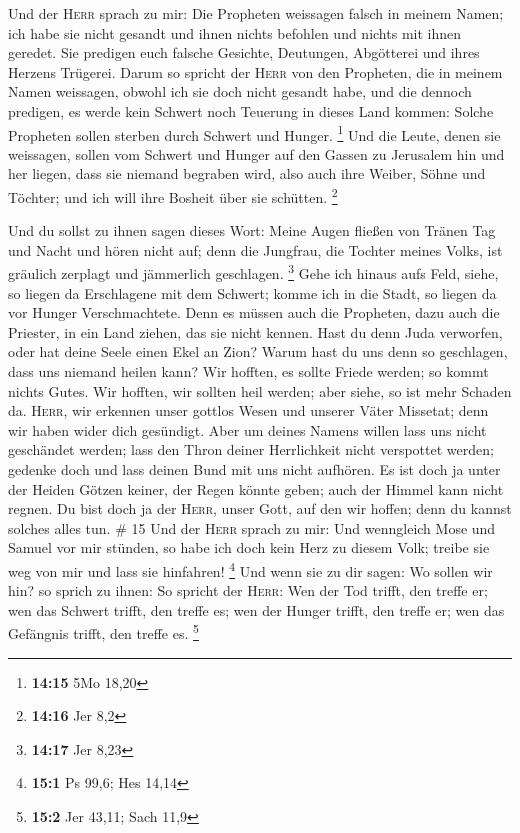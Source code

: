  Und der \textsc{Herr} sprach zu mir: Die Propheten
weissagen falsch in meinem Namen; ich habe sie nicht gesandt und ihnen
nichts befohlen und nichts mit ihnen geredet. Sie predigen euch falsche
Gesichte, Deutungen, Abgötterei und ihres Herzens Trügerei.
 Darum so spricht der \textsc{Herr} von den Propheten,
die in meinem Namen weissagen, obwohl ich sie doch nicht gesandt habe,
und die dennoch predigen, es werde kein Schwert noch Teuerung in dieses
Land kommen: Solche Propheten sollen sterben durch Schwert und Hunger.
\footnote{\textbf{14:15} 5Mo 18,20}  Und die Leute, denen
sie weissagen, sollen vom Schwert und Hunger auf den Gassen zu Jerusalem
hin und her liegen, dass sie niemand begraben wird, also auch ihre
Weiber, Söhne und Töchter; und ich will ihre Bosheit über sie schütten.
\footnote{\textbf{14:16} Jer 8,2}

 Und du sollst zu ihnen sagen dieses Wort: Meine Augen
fließen von Tränen Tag und Nacht und hören nicht auf; denn die Jungfrau,
die Tochter meines Volks, ist gräulich zerplagt und jämmerlich
geschlagen. \footnote{\textbf{14:17} Jer 8,23}  Gehe ich
hinaus aufs Feld, siehe, so liegen da Erschlagene mit dem Schwert; komme
ich in die Stadt, so liegen da vor Hunger Verschmachtete. Denn es müssen
auch die Propheten, dazu auch die Priester, in ein Land ziehen, das sie
nicht kennen.  Hast du denn Juda verworfen, oder hat
deine Seele einen Ekel an Zion? Warum hast du uns denn so geschlagen,
dass uns niemand heilen kann? Wir hofften, es sollte Friede werden; so
kommt nichts Gutes. Wir hofften, wir sollten heil werden; aber siehe, so
ist mehr Schaden da.  \textsc{Herr}, wir erkennen unser
gottlos Wesen und unserer Väter Missetat; denn wir haben wider dich
gesündigt.  Aber um deines Namens willen lass uns nicht
geschändet werden; lass den Thron deiner Herrlichkeit nicht verspottet
werden; gedenke doch und lass deinen Bund mit uns nicht aufhören.
 Es ist doch ja unter der Heiden Götzen keiner, der Regen
könnte geben; auch der Himmel kann nicht regnen. Du bist doch ja der
\textsc{Herr}, unser Gott, auf den wir hoffen; denn du kannst solches
alles tun. \# 15  Und der \textsc{Herr} sprach zu mir: Und
wenngleich Mose und Samuel vor mir stünden, so habe ich doch kein Herz
zu diesem Volk; treibe sie weg von mir und lass sie hinfahren!
\footnote{\textbf{15:1} Ps 99,6; Hes 14,14}  Und wenn sie
zu dir sagen: Wo sollen wir hin? so sprich zu ihnen: So spricht der
\textsc{Herr}: Wen der Tod trifft, den treffe er; wen das Schwert
trifft, den treffe es; wen der Hunger trifft, den treffe er; wen das
Gefängnis trifft, den treffe es. \footnote{\textbf{15:2} Jer 43,11; Sach
  11,9}

